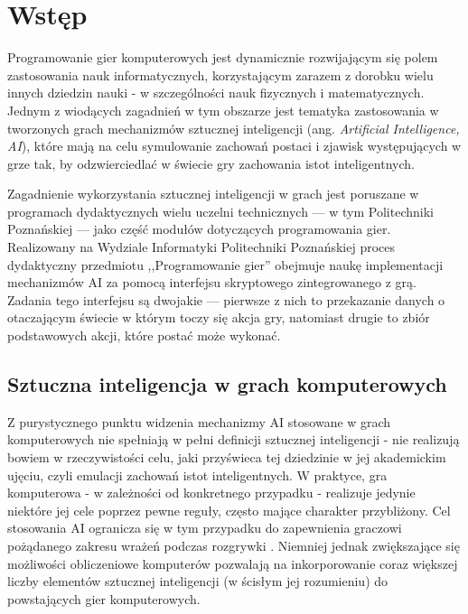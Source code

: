 \chapter{Wstęp} \label{chapter:intro}

Programowanie gier komputerowych jest dynamicznie rozwijającym się polem zastosowania nauk informatycznych, korzystającym zarazem z dorobku wielu innych dziedzin nauki - w szczególności nauk fizycznych i matematycznych. Jednym z wiodących zagadnień w tym obszarze jest tematyka zastosowania w tworzonych grach mechanizmów sztucznej inteligencji (ang. \textit{Artificial Intelligence, AI}), które mają na celu symulowanie zachowań postaci i zjawisk występujących w grze tak, by odzwierciedlać w świecie gry zachowania istot inteligentnych.

Zagadnienie wykorzystania sztucznej inteligencji w grach jest poruszane w programach dydaktycznych wielu uczelni technicznych --- w tym Politechniki Poznańskiej --- jako część modułów dotyczących programowania gier. Realizowany na Wydziale Informatyki Politechniki Poznańskiej proces dydaktyczny przedmiotu ,,Programowanie gier'' obejmuje naukę implementacji mechanizmów AI za pomocą interfejsu skryptowego zintegrowanego z grą. Zadania tego interfejsu są dwojakie --- pierwsze z nich to przekazanie danych o otaczającym świecie w którym toczy się akcja gry, natomiast drugie to zbiór podstawowych akcji, które postać może wykonać.



\section{Sztuczna inteligencja w grach komputerowych}

Z purystycznego punktu widzenia mechanizmy AI stosowane w grach komputerowych nie spełniają w pełni definicji sztucznej inteligencji - nie realizują bowiem w rzeczywistości celu, jaki przyświeca tej dziedzinie w jej akademickim ujęciu, czyli emulacji zachowań istot inteligentnych. W praktyce, gra komputerowa - w zależności od konkretnego przypadku - realizuje jedynie niektóre jej cele poprzez pewne reguły, często mające charakter przybliżony. Cel stosowania AI ogranicza się w tym przypadku do zapewnienia graczowi pożądanego zakresu wrażeń podczas rozgrywki \cite{adaptiveai}. Niemniej jednak zwiększające się możliwości obliczeniowe komputerów pozwalają na inkorporowanie coraz większej liczby elementów sztucznej inteligencji (w ścisłym jej rozumieniu) do powstających gier komputerowych.

